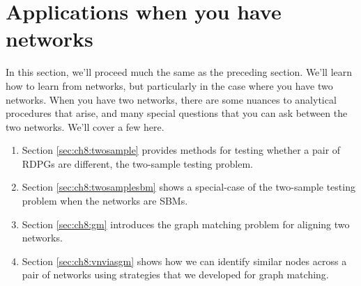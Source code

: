 \chapter{Applications when you have networks}
\label{sec:ch8}

In this section, we'll proceed much the same as the preceding section. We'll learn how to learn from networks, but particularly in the case where you have two networks. When you have two networks, there are some nuances to analytical procedures that arise, and many special questions that you can ask between the two networks. We'll cover a few here.

\begin{enumerate}
    \item Section \ref{sec:ch8:twosample} provides methods for testing whether a pair of RDPGs are different, the two-sample testing problem.
    \item Section \ref{sec:ch8:twosamplesbm} shows a special-case of the two-sample testing problem when the networks are SBMs.
    \item Section \ref{sec:ch8:gm} introduces the graph matching problem for aligning two networks.
    \item Section \ref{sec:ch8:vnviasgm} shows how we can identify similar nodes across a pair of networks using strategies that we developed for graph matching.
\end{enumerate}







